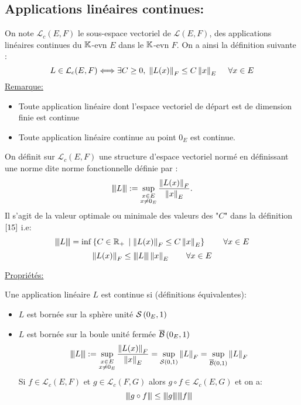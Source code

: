 \documentclass[12pt,a4paper]{article}
\begin{document}
	\subsection{Applications linéaires continues:}
	On note $\mathcal{L}_c (E,F)$ le sous-espace vectoriel de $\mathcal{L}(E,F)$, des applications linéaires continues du $\ens{K}$-evn $E$ dans le $\ens{K}$-evn $F$. On a ainsi la définition suivante :
	\begin{equation}
		L\in \mathcal{L}_c (E,F) \Longleftrightarrow \exists C\geq 0,\gesp \norm{L(x)}_F\leq C\norm{x}_E \quad \gesp\forall x\in E \label{15} 
	\end{equation}
	\underline{Remarque:} 
	\begin{itemize}
		\item Toute application linéaire dont l'espace vectoriel de départ est de dimension finie est continue
		\item Toute application linéaire continue au point $0_E$ est continue.
	\end{itemize}
	\par On définit sur $\mathcal{L}_c (E,F)$ une structure d'espace vectoriel normé en définissant une norme dite norme fonctionnelle définie par :
	\[ \fonctnorm{L}:=\sup_{\substack{x\in E \\ x\neq 0_E}}  \dfrac{\norm{L(x)}_F}{\norm{x}_E}.\]
	Il s'agit de la valeur optimale ou minimale des valeurs des "$C$" dans la définition $\eqref{15}$ i.e:
	\[ \fonctnorm{L}=\inf\ensemble{C\in \ens{R}_+}{\norm{L(x)}_F\leq C\norm{x}_E}\qquad \forall x\in E \]
	$$ \norm{L(x)}_F \leq \fonctnorm{L} \norm{x}_E\qquad \forall x\in E  $$
	
	\underline{Propriétés:}\\
	\par Une application linéaire $L$ est continue si (définitions équivalentes):
	\begin{itemize}
		\item$L$ est bornée sur la sphère unité $ \sphere{0_E}{1}$
		\item $L$ est bornée sur la boule unité fermée $ \boulef{0_E}{1}$
		\[ \fonctnorm{L}:=\sup_{\substack{x\in E \\ x\neq 0_E}}  \dfrac{\norm{L(x)}_F}{\norm{x}_E}= \sup_{\sphere{0}{1}} \norm{L}_F=\sup_{\boulef{0}{1}} \norm{L}_F \]
		Si $f\in \mathcal{L}_c (E,F)$ et $g\in \mathcal{L}_c (F,G)$ alors $g\circ f \in\mathcal{L}_c (E,G) $ et on a:
		$$ \fonctnorm{g\circ f}\leq \fonctnorm{g} \fonctnorm{f} $$
	\end{itemize}
\end{document}
